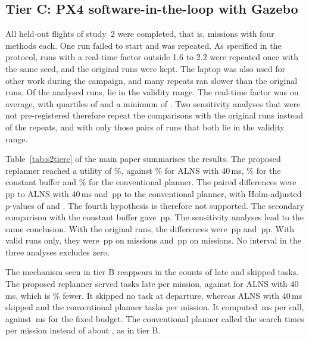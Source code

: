 \subsection{Tier C: PX4 software-in-the-loop with Gazebo}\label{sec:Ss2-tierc}
All  held-out flights of study~2 were completed, that is,  missions with four methods each. One run
failed to start and was repeated. As specified in the protocol,  runs with a real-time factor outside
1.6 to 2.2 were repeated once with the same seed, and the original runs were kept. The laptop was also used for other
work during the campaign, and many repeats ran slower than the original runs. Of the  analysed runs,
 lie in the validity range. The real-time factor was  on average, with quartiles of
 and a minimum of . Two sensitivity analyses that were not pre-registered therefore repeat the
comparisons with the original runs instead of the repeats, and with only those pairs of runs that both lie in the
validity range.

Table~\ref{tab:s2tierc} of the main paper summarises the results. The proposed replanner reached a utility of \%, against
\% for ALNS with 40\,ms, \% for the constant buffer and \% for the conventional
planner. The paired differences were \,pp to ALNS with 40\,ms and \,pp to the conventional
planner, with Holm-adjusted $p$-values of  and . The fourth hypothesis is therefore not
supported. The secondary comparison with the constant buffer gave \,pp. The sensitivity analyses lead to
the same conclusion. With the original runs, the differences were \,pp and \,pp.
With valid runs only, they were \,pp on  missions and \,pp on
 missions. No interval in the three analyses excludes zero.

The mechanism seen in tier B reappears in the counts of late and skipped tasks. The proposed replanner served
 tasks late per mission, against  for ALNS with 40\,ms, which is \%
fewer. It skipped no task at departure, whereas ALNS with 40\,ms skipped  and the conventional planner
 tasks per mission. It computed \,ms per call, against \,ms for the fixed
budget. The conventional planner called the search  times per mission instead of about
, as in tier B.



